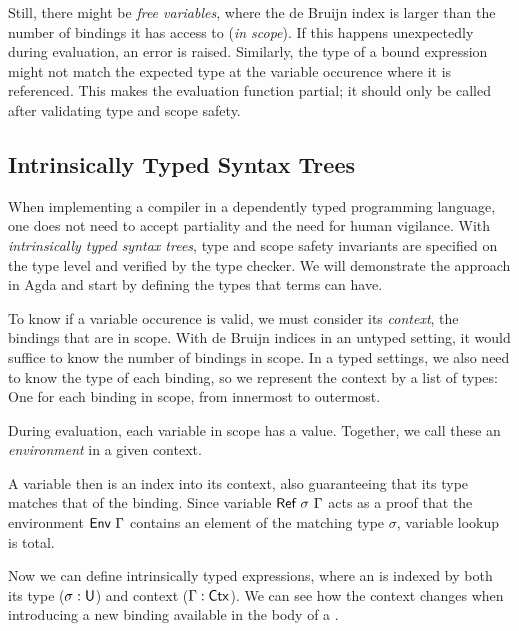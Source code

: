 \documentclass[11pt,a4paper]{article}
\begin{document}
Still, there might be \emph{free variables},
where the de Bruijn index is larger than the number of bindings it has access to
(\emph{in scope}).
If this happens unexpectedly during evaluation, an error is raised.
Similarly, the type of a bound expression might not match the expected type at the variable occurence
where it is referenced.
This makes the evaluation function partial;
it should only be called after validating type and scope safety.


\subsection{Intrinsically Typed Syntax Trees}

When implementing a compiler in a dependently typed programming language,
one does not need to accept partiality and the need for human vigilance.
With \emph{intrinsically typed syntax trees}, type and scope safety invariants
are specified on the type level and verified by the type checker.
We will demonstrate the approach in Agda and start by defining the types that terms can have.

\CodeLangTypes

To know if a variable occurence is valid, we must consider its \emph{context},
the bindings that are in scope.
With de Bruijn indices in an untyped setting, it would suffice to know the number of bindings in scope.
In a typed settings, we also need to know the type of each binding,
so we represent the context by a list of types: One for each binding in scope, from innermost to outermost.

\CodeLangCtx

During evaluation, each variable in scope has a value.
Together, we call these an \emph{environment} in a given context.

\CodeLangEnv

A variable then is an index into its context,
also guaranteeing that its type matches that of the binding.
Since variable $\AgdaDatatype{Ref}\ \sigma\ \Gamma$ acts as a proof that
the environment $\AgdaDatatype{Env}\ \Gamma$ contains an element of the matching type $\sigma$,
variable lookup is total.

\CodeLangRef

Now we can define intrinsically typed expressions,
where an  is indexed by both
its type ($\sigma : \AgdaDatatype{U}$)
and context ($\Gamma : \AgdaDatatype{Ctx}$).
We can see how the context changes when introducing a new binding
available in the body of a .
\end{document}

